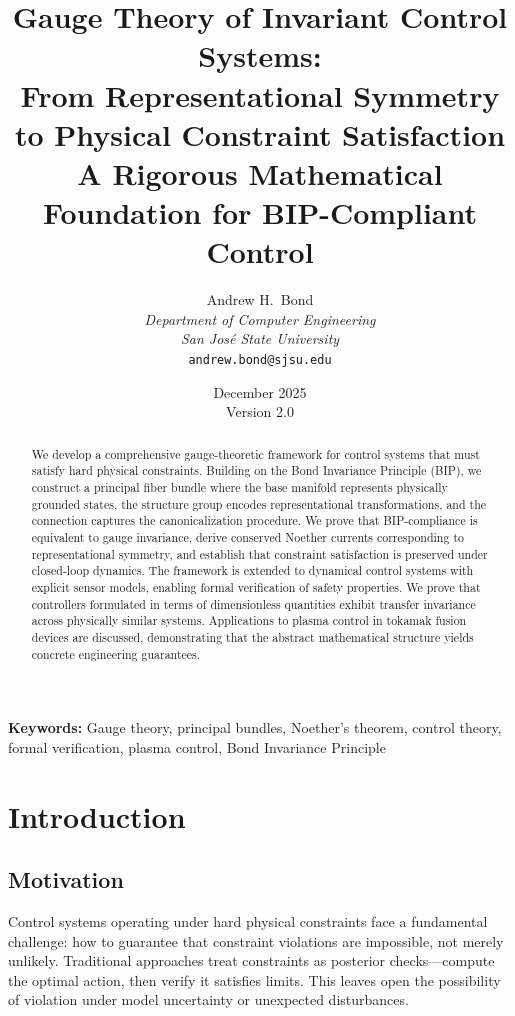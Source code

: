 \documentclass[11pt]{article}
\title{Gauge Theory of Invariant Control Systems:\\
From Representational Symmetry to Physical Constraint Satisfaction\\[1em]
\large A Rigorous Mathematical Foundation for BIP-Compliant Control}
\author{Andrew H.\ Bond\\
\textit{Department of Computer Engineering}\\
\textit{San Jos\'{e} State University}\\
\texttt{andrew.bond@sjsu.edu}}
\date{December 2025\\Version 2.0}
\begin{document}
\maketitle

\begin{abstract}
We develop a comprehensive gauge-theoretic framework for control systems that must
satisfy hard physical constraints. Building on the Bond Invariance Principle (BIP), we
construct a principal fiber bundle where the base manifold represents physically grounded
states, the structure group encodes representational transformations, and the connection
captures the canonicalization procedure. We prove that BIP-compliance is equivalent to
gauge invariance, derive conserved Noether currents corresponding to representational symmetry,
and establish that constraint satisfaction is preserved under closed-loop dynamics.
The framework is extended to dynamical control systems with explicit sensor models, enabling
formal verification of safety properties. We prove that controllers formulated in terms
of dimensionless quantities exhibit transfer invariance across physically similar systems. Applications
to plasma control in tokamak fusion devices are discussed, demonstrating that the
abstract mathematical structure yields concrete engineering guarantees.
\end{abstract}

\noindent\textbf{Keywords:} Gauge theory, principal bundles, Noether's theorem, control theory, formal
verification, plasma control, Bond Invariance Principle

\tableofcontents

\newpage

\section{Introduction}

\subsection{Motivation}

Control systems operating under hard physical constraints face a fundamental challenge: how to
guarantee that constraint violations are impossible, not merely unlikely. Traditional approaches
treat constraints as posterior checks---compute the optimal action, then verify it satisfies limits.
This leaves open the possibility of violation under model uncertainty or unexpected disturbances.
\end{document}
